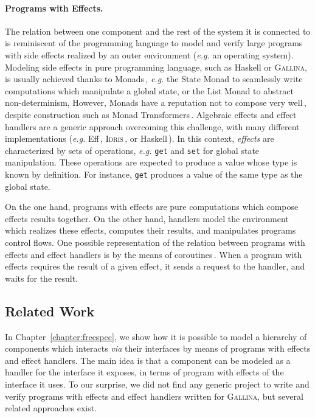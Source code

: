 \paragraph{Programs with Effects.}
%
The relation between one component and the rest of the system it is connected to
is reminiscent of the programming language to model and verify large programs
with side effects realized by an outer environment (\emph{e.g.} an operating
system).
%
Modeling side effects in pure programming language, such as Haskell or {\scshape
  Gallina}, is usually achieved thanks to
Monads\,\cite{wadler1990comprehending,jones2005io}, \emph{e.g.} the State Monad
to seamlessly write computations which manipulate a global state, or the List
Monad to abstract non-determinism,
%
However, Monads have a reputation not to compose very
well\,\cite{hyland2006combining}, despite construction such as Monad
Transformers\,\cite{liang1995mtl}.
%
Algebraic effects and effect handlers are a generic approach overcoming this
challenge, with many different implementations (\emph{e.g.}
Eff\,\cite{bauer2015effects}, {\scshape Idris}\,\cite{brady2013idris}, or
Haskell\,\cite{kiselyov2013extensible}).
%
In this context, \emph{effects} are characterized by sets of operations,
\emph{e.g.} \texttt{get} and \texttt{set} for global state manipulation.
%
These operations are expected to produce a value whose type is known by
definition.
%
For instance, \texttt{get} produces a value of the same type as the global
state.

On the one hand, programs with effects are pure computations which compose
effects results together.
%
On the other hand, handlers model the environment which realizes these effects,
computes their results, and manipulates programs control flows.
%
One possible representation of the relation between programs with effects and
effect handlers is by the means of coroutines\,\cite{kiselyov2013extensible}.
%
When a program with effects requires the result of a given effect, it sends a
request to the handler, and waits for the result.

\subsection{Related Work}
\label{subsec:sota:comprelated}

In Chapter~\ref{chapter:freespec}, we show how it is possible to model a
hierarchy of components which interacts \emph{via} their interfaces by means of
programs with effects and effect handlers.
%
The main idea is that a component can be modeled as a handler for the interface
it exposes, in terms of program with effects of the interface it uses.
%
To our surprise, we did not find any generic project to write and verify
programs with effects and effect handlers written for {\scshape Gallina}, but
several related approaches exist.


